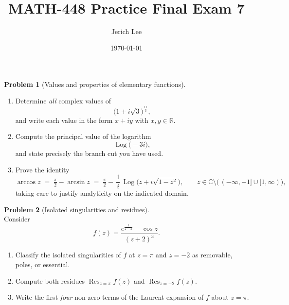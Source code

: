 \documentclass[12pt]{article}
\title{MATH-448 Practice Final Exam 7}
\author{Jerich Lee}
\date{\today}
\DeclareMathOperator{\Log}{Log}
\theoremstyle{definition} %
\newtheorem{problem}{Problem}
\theoremstyle{plain} %
\begin{document}
\maketitle
\pagebreak

  
  \pagebreak
  \begin{problem}[Values and properties of elementary functions]\mbox{}\\[4pt]
  \begin{enumerate}[label=(\alph*),itemsep=6pt]
    \item Determine \emph{all} complex values of 
          \[
            \bigl(1+i\sqrt{3}\bigr)^{\frac{11}{3}},
          \]
          and write each value in the form $x+iy$ with $x,y\in\mathbb{R}$.
    \item Compute the principal value of the logarithm
          \[
            \Log\!\bigl(-3i\bigr),
          \]
          and state precisely the branch cut you have used.
    \item Prove the identity
          \[
            \arccos z
            \;=\;
            \tfrac{\pi}{2}-\arcsin z
            \;=\;
            \tfrac{\pi}{2}
            -\,\frac{1}{i}\,\Log\!\bigl(z+i\sqrt{1-z^{2}}\bigr),
            \qquad z\in\mathbb{C}\setminus\bigl(\,(-\infty,-1]\cup[1,\infty)\bigr),
          \]
          taking care to justify analyticity on the indicated domain.
  \end{enumerate}
  \end{problem}
  
  \pagebreak
  \begin{problem}[Isolated singularities and residues]\mbox{}\\[4pt]
  Consider
  \[
    f(z)=\frac{e^{\frac{1}{z-\pi}}-\cos z}{(z+2)^{3}}.
  \]
  \begin{enumerate}[label=(\alph*),itemsep=6pt]
    \item Classify the isolated singularities of $f$ at $z=\pi$ and $z=-2$ as removable, poles, or essential.
    \item Compute both residues $\operatorname*{Res}_{z=\pi}f(z)$ and $\operatorname*{Res}_{z=-2}f(z)$.
    \item Write the first \emph{four} non‑zero terms of the Laurent expansion of $f$ about $z=\pi$.
  \end{enumerate}
  \end{problem}
  
\end{document}

